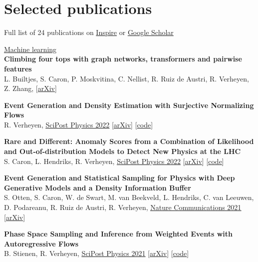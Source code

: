 \documentclass[a4paper,12pt]{article}
\begin{document}
\section{Selected publications}
Full list of 24 publications on \href{https://inspirehep.net/authors/1777870?ui-citation-summary=true}{Inspire} or \href{https://scholar.google.com/citations?user=MRTAm7UAAAAJ&hl=en&oi=ao}{Google Scholar}

\underline{\large{Machine learning}} \\ [5pt]
\textbf{Climbing four tops with graph networks, transformers and pairwise features} \\
L. Builtjes, S. Caron, P. Moskvitina, C. Nellist, R. Ruiz de Austri, R. Verheyen, Z. Zhang,
[\href{https://arxiv.org/pdf/2211.05143.pdf}{arXiv}]


\textbf{Event Generation and Density Estimation with Surjective Normalizing Flows} \\
R. Verheyen, 
\href{https://scipost.org/10.21468/SciPostPhys.13.3.047}{\underline{SciPost Physics 2022}} [\href{https://arxiv.org/abs/2205.01697}{arXiv}] [\href{https://github.com/rbvh/surflows}{code}]

\textbf{Rare and Different: Anomaly Scores from a Combination of Likelihood and Out-of-distribution Models to Detect New Physics at the LHC} \\
S. Caron, L. Hendriks, R. Verheyen,
\href{https://scipost.org/10.21468/SciPostPhys.12.1.043}{\underline{SciPost Physics 2022}} [\href{https://arxiv.org/pdf/2105.14027.pdf}{arXiv}] [\href{https://github.com/bostdiek/DarkMachines-UnsupervisedChallenge}{code}]

\textbf{Event Generation and Statistical Sampling for Physics with Deep Generative Models and a Density Information Buffer} \\
S. Otten, S. Caron, W. de Swart, M. van Beekveld, L. Hendriks, C. van Leeuwen, D. Podareanu, R. Ruiz de Austri, R. Verheyen, 
\href{https://www.nature.com/articles/s41467-021-22616-z}{\underline{Nature Communications 2021}} [\href{https://arxiv.org/abs/1901.00875}{arXiv}]

\textbf{Phase Space Sampling and Inference from Weighted Events with Autoregressive Flows} \\
B. Stienen, R. Verheyen, 
\href{https://scipost.org/10.21468/SciPostPhys.10.2.038}{\underline{SciPost Physics 2021}} [\href{https://arxiv.org/pdf/2011.13445.pdf}{arXiv}] [\href{https://github.com/rbvh/PhaseSpaceAutoregressiveFlow}{code}]
\end{document}
